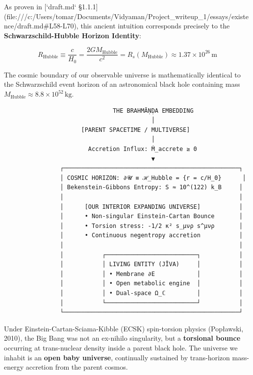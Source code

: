 \documentclass[11pt,a4paper]{article}
\theoremstyle{definition}
\theoremstyle{remark}
\begin{document}
As proven in [`draft.md` §1.1.1](file:///c:/Users/tomar/Documents/Vidyaman/Project_writeup_1/essays/existence/draft.md\#L58-L70), this ancient intuition corresponds precisely to the \textbf{Schwarzschild-Hubble Horizon Identity}:

\begin{equation}
\boxed{R_{\text{Hubble}} \equiv \frac{c}{H_0} = \frac{2 G M_{\text{Hubble}}}{c^2} = R_s(M_{\text{Hubble}}) \approx 1.37 \times 10^{26} \, \mathrm{m}}
\end{equation}

The cosmic boundary of our observable universe is mathematically identical to the Schwarzschild event horizon of an astronomical black hole containing mass $M_{\text{Hubble}} \approx 8.8 \times 10^{52} \, \mathrm{kg}$. 

\begin{verbatim}
                               THE BRAHMĀṆḌA EMBEDDING
                                          │
                      [PARENT SPACETIME / MULTIVERSE]
                                          │
                        Accretion Influx: Ṁ_accrete ≥ 0
                                          ▼
                ┌──────────────────────────────────────────────────┐
                │ COSMIC HORIZON: ∂𝓤 ≡ ℋ_Hubble = {r = c/H_0}      │
                │ Bekenstein-Gibbons Entropy: S ≈ 10^(122) k_B     │
                │                                                  │
                │      [OUR INTERIOR EXPANDING UNIVERSE]           │
                │      • Non-singular Einstein-Cartan Bounce       │
                │      • Torsion stress: -1/2 κ² s_μνρ s^μνρ       │
                │      • Continuous negentropy accretion           │
                │                                                  │
                │           ┌──────────────────────────┐           │
                │           │ LIVING ENTITY (JĪVA)     │           │
                │           │ • Membrane ∂E            │           │
                │           │ • Open metabolic engine  │           │
                │           │ • Dual-space Ω_ℂ         │           │
                │           └──────────────────────────┘           │
                └──────────────────────────────────────────────────┘
\end{verbatim}

Under Einstein-Cartan-Sciama-Kibble (ECSK) spin-torsion physics (Popławski, 2010), the Big Bang was not an ex-nihilo singularity, but a \textbf{torsional bounce} occurring at trans-nuclear density inside a parent black hole. The universe we inhabit is an \textbf{open baby universe}, continually sustained by trans-horizon mass-energy accretion from the parent cosmos.
\end{document}
